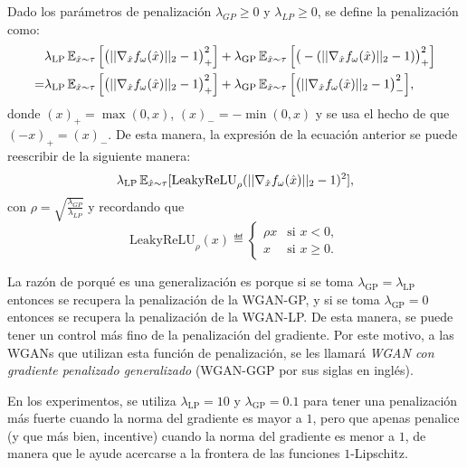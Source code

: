 Dado los parámetros de penalización $\lambda_{GP} \geq 0$ y $\lambda_{LP} \geq 0$, se define la penalización como:
\begin{align*}
    & \lambda_{\mathrm{LP}} \Exp_{\hat x \sim \tau} \Big[\big(||\nabla_{\hat x} f_{\omega}(\hat x)||_2 - 1\big)_{+}^2\Big]
  + \lambda_{\mathrm{GP}} \Exp_{\hat x \sim \tau} \Big[\big( - (||\nabla_{\hat x} f_{\omega}(\hat x)||_2 - 1)\big)_{+}^2\Big] \\
  = & \lambda_{\mathrm{LP}} \Exp_{\hat x \sim \tau} \Big[\big(||\nabla_{\hat x} f_{\omega}(\hat x)||_2 - 1\big)_{+}^2\Big]
  + \lambda_{\mathrm{GP}} \Exp_{\hat x \sim \tau} \Big[\big( ||\nabla_{\hat x} f_{\omega}(\hat x)||_2 - 1 \big)_{-}^2\Big],
\end{align*}
donde $(x)_{+} = \max(0, x)$, $(x)_{-} = -\min(0, x)$ y se usa el hecho de que $(-x)_{+} = (x)_{-}$. De esta manera, la expresión de la ecuación anterior se puede reescribir de la siguiente manera:
\begin{equation}
  \lambda_{\mathrm{LP}} \Exp_{\hat x \sim \tau} [\mathrm{LeakyReLU}_{\rho}(||\nabla_{\hat x} f_{\omega}(\hat x)||_2 - 1)^2],
\end{equation}
con $\rho = \sqrt{\frac{\lambda_{GP}}{\lambda_{LP}}}$ y recordando que
\begin{equation}
  \mathrm{LeakyReLU}_{\rho} (x) \eqdef \begin{cases}
    \rho x & \text{si } x < 0,    \\
    x      & \text{si } x \geq 0.
  \end{cases}
\end{equation}

La razón de porqué es una generalización es porque si se toma $\lambda_{\mathrm{GP}} = \lambda_{\mathrm{LP}}$ entonces se recupera la penalización de la WGAN-GP, y si se toma $\lambda_{\mathrm{GP}} = 0$ entonces se recupera la penalización de la WGAN-LP. De esta manera, se puede tener un control más fino de la penalización del gradiente. Por este motivo, a las WGANs que utilizan esta función de penalización, se les llamará \textit{WGAN con gradiente penalizado generalizado} (WGAN-GGP por sus siglas en inglés).

En los experimentos, se utiliza $\lambda_{\mathrm{LP}} = 10$ y $\lambda_{\mathrm{GP}} = 0.1$ para tener una penalización más fuerte cuando la norma del gradiente es mayor a $1$, pero que apenas penalice (y que más bien, incentive) cuando la norma del gradiente es menor a $1$, de manera que le ayude acercarse a la frontera de las funciones $1$-Lipschitz.

